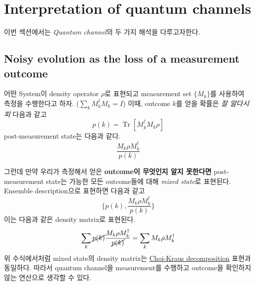 \section{Interpretation of quantum channels}
이번 섹션에서는 \textit{Quantum channel}의 두 가지 해석을 다루고자한다.
\subsection{Noisy evolution as the loss of a measurement outcome}
어떤 System이 density operator $\rho$로 표현되고 measurement set $\{ M_k \}$를 사용하여 측정을 수행한다고 하자. ($\sum_k M_k^\dagger M_k = I$) 이때, outcome $k$를 얻을 확률은 \textit{잘 알다시피} 다음과 같고
\begin{equation*}
    p(k)=\operatorname{Tr}\left[M_k^{\dagger} M_k \rho\right]
\end{equation*}
post-measurement state는 다음과 같다. 
\begin{equation*}
    \frac{M_k \rho M_k^{\dagger}}{p(k)}
\end{equation*}

그런데 만약 우리가 측정해서 얻은 \textbf{outcome이 무엇인지 알지 못한다면} post-measurement state는 가능한 모든 outcome들에 대해 \textit{mixed state}로 표현된다. Ensemble description으로 표현하면 다음과 같고
\begin{equation*}
    \bigg\{p(k), \frac{M_k \rho M_k^{\dagger}}{p(k)}\bigg\}
\end{equation*}
이는 다음과 같은 density matrix로 표현된다. 
\begin{equation*}
    \sum_k \cancel{p(k)} \frac{M_k \rho M_k^{\dagger}}{\cancel{p(k)}}=\sum_k M_k \rho M_k^{\dagger}
\end{equation*}
위 수식에서처럼 mixed state의 density matrix는 \hyperref[thm:Choi-Kraus]{Choi-Kraus decomposition} 표현과 동일하다. 따라서 quantum channel을 measurement를 수행하고 outcome을 확인하지 않는 연산으로 생각할 수 있다. 


